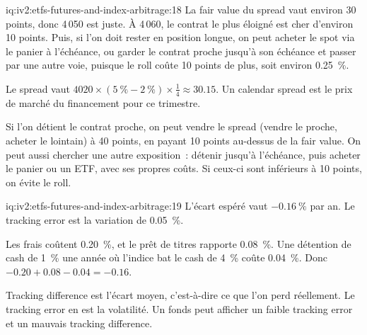\begin{solution}{iq:iv2:etfs-futures-and-index-arbitrage:18}
La fair value du spread vaut environ 30 points, donc 4\,050 est juste. À 4\,060, le contrat le plus éloigné est cher d'environ 10 points. Puis, si l'on doit rester en position longue, on peut acheter le spot via le panier à l'échéance, ou garder le contrat proche jusqu'à son échéance et passer par une autre voie, puisque le roll coûte 10 points de plus, soit environ 0.25~\%.

Le spread vaut $4020 \times (5~\% - 2~\%) \times \tfrac14 \approx 30.15$. Un calendar spread est le prix de marché du financement pour ce trimestre.

Si l'on détient le contrat proche, on peut vendre le spread (vendre le proche, acheter le lointain) à 40 points, en payant 10 points au-dessus de la fair value. On peut aussi chercher une autre exposition~: détenir jusqu'à l'échéance, puis acheter le panier ou un ETF, avec ses propres coûts. Si ceux-ci sont inférieurs à 10 points, on évite le roll.

\end{solution}

\begin{solution}{iq:iv2:etfs-futures-and-index-arbitrage:19}
L'écart espéré vaut $-0.16~\%$ par an. Le tracking error est la variation de 0.05~\%.

Les frais coûtent 0.20~\%, et le prêt de titres rapporte 0.08~\%. Une détention de cash de 1~\% une année où l'indice bat le cash de 4~\% coûte 0.04~\%. Donc $-0.20 + 0.08 - 0.04 = -0.16$.

Tracking difference est l'écart moyen, c'est-à-dire ce que l'on perd réellement. Le tracking error en est la volatilité. Un fonds peut afficher un faible tracking error et un mauvais tracking difference.

\end{solution}

